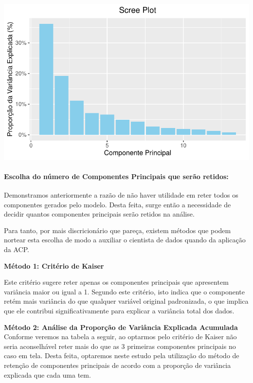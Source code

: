\documentclass[
  letterpaper,
  DIV=11,
  numbers=noendperiod]{scrartcl}
\let\oldparagraph\paragraph
\renewcommand{\paragraph}[1]{\oldparagraph{#1}\mbox{}}
\begin{document}
\includegraphics{wines_analysis_files/figure-pdf/unnamed-chunk-21-1.pdf}

\paragraph{Escolha do número de Componentes Principais que serão
retidos:}\label{escolha-do-nuxfamero-de-componentes-principais-que-seruxe3o-retidos}

Demonstramos anteriormente a razão de não haver utilidade em reter todos
os componentes gerados pelo modelo. Desta feita, surge então a
necessidade de decidir quantos componentes principais serão retidos na
análise.

Para tanto, por mais discricionário que pareça, existem métodos que
podem nortear esta escolha de modo a auxiliar o cientista de dados
quando da aplicação da ACP.

\textbf{Método 1: Critério de Kaiser}

Este critério sugere reter apenas os componentes principais que
apresentem variância maior ou igual a 1. Segundo este critério, isto
indica que o componente retém mais variância do que qualquer variável
original padronizada, o que implica que ele contribui significativamente
para explicar a variância total dos dados.

\textbf{Método 2: Análise da Proporção de Variância Explicada Acumulada}
Conforme veremos na tabela a seguir, ao optarmos pelo critério de Kaiser
não seria aconselhável reter mais do que as 3 primeiras componentes
principais no caso em tela. Desta feita, optaremos neste estudo pela
utilização do método de retenção de componentes principais de acordo com
a proporção de variância explicada que cada uma tem.
\end{document}

